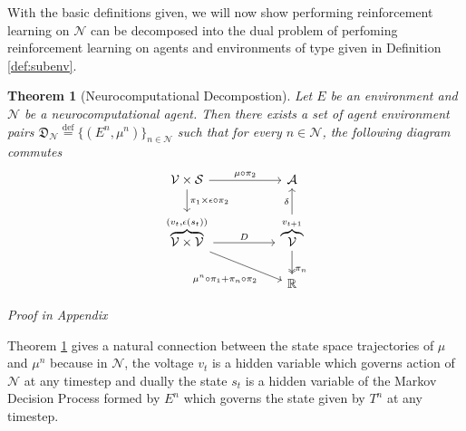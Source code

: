 \documentclass{article} %
\newtheorem{theorem}{Theorem}
\numberwithin{equation}{subsection}
\numberwithin{theorem}{subsection}
\def\reals{{\mathbb R}}
\def\defeq{\stackrel{\text{def}}{=}}
\theoremstyle{named}
\def\scriptv{{\mathcal V}}
\def\scripta{{\mathcal A}}
\def\scriptn{{\mathcal N}}
\def\scripts{{\mathcal S}}
\begin{document}
With the basic definitions given, we will now show performing reinforcement learning on $\scriptn$ can be decomposed into the dual problem of perfoming reinforcement learning on agents and environments of type given in Definition \ref{def:subenv}.

\begin{theorem}[Neurocomputational Decompostion]\label{thm:ncomp}
  Let $E$ be an environment and $\scriptn$ be a neurocomputational agent. Then there exists a set of agent environment pairs $\mathfrak{D}_\scriptn \defeq \{(E^n, \mu^n)\}_{n\in \scriptn}$ such that for every $n \in \scriptn$, the following diagram commutes
\begin{equation}\label{eq:sub_env_com}
          \begin{tikzcd} %
        \scriptv  \times \scripts \arrow{r}{\mu\circ\pi_2}
             \arrow{d}
               {\pi_1  \times\epsilon \circ \pi_2}  &[+25pt]  \scripta    \\
          \overbrace{\scriptv \times \scriptv}^{(v_{t},\epsilon(s_t))}
                      \arrow{r}{D}
                                  \arrow[pos = 0.7]{rd}[swap]{\mu^n\circ\pi_1 + \pi_n \circ \pi_2}
                      & \overbrace{\scriptv}^{v_{t+1}}
                                            \arrow[two heads, pos=0.8]
                                              {d}
                                              {\pi_n}
                                            \arrow{u}{\delta} \\
  &\reals
         \end{tikzcd}
    \end{equation}
\end{theorem}
\emph{Proof in Appendix}

Theorem \ref{thm:ncomp} gives a natural connection between the state space trajectories of $\mu$ and $\mu^n$ because in $\scriptn$, the voltage $v_t$ is a hidden variable which governs action of $\scriptn$ at any timestep and dually the state $s_t$ is a hidden variable of the Markov Decision Process formed by $E^n$ which governs the state given by $T^n$ at any timestep. 
\end{document}
